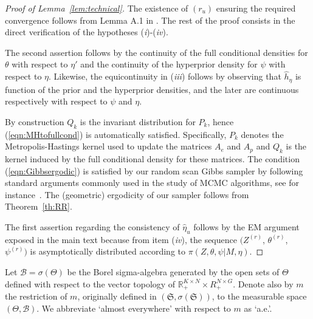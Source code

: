 \documentclass[11pt]{amsart}
\theoremstyle{definition}
\begin{document}
\begin{proof}[Proof of Lemma~\ref{lem:technical}] The existence of
$(r_u)$ ensuring the required convergence follows from Lemma A.1 in
\cite{C01}. The rest of the proof consists in the direct verification
of the hypotheses (\emph{i})-(\emph{iv}).

The second assertion follows by the continuity of the full conditional
densities for $\theta$ with respect to $\eta'$ and the continuity of
the hyperprior density for $\psi$ with respect to $\eta$. Likewise,
the equicontinuity in (\emph{iii}) follows by observing that $\widehat
h_\eta$ is function of the prior and the hyperprior densities, and the
later are continuous respectively with respect to $\psi$ and $\eta$.

By construction $Q_k$ is the invariant distribution for $P_k$, hence
(\ref{eqn:MHtofullcond}) is automatically satisfied. Specifically,
$P_k$ denotes the Metropolis-Hastings kernel used to update the
matrices $A_e$ and $A_p$ and $Q_k$ is the kernel induced by the full
conditional density for these matrices. The condition
(\ref{eqn:Gibbsergodic}) is satisfied by our random scan Gibbs sampler
by following standard arguments commonly used in the study of MCMC
algorithms, see for instance~\cite{RC}. The (geometric) ergodicity of
our sampler follows from Theorem~\ref{th:RR}.

The first assertion regarding the consistency of $\hat\eta_u$ follows
by the EM argument exposed in the main text because from item
(\emph{iv}), the sequence $(Z^{(r)}$, $\theta^{(r)}$, $\psi^{(r)})$ is
asymptotically distributed according to $\pi(Z, \theta, \psi|M,
\eta)$.
\end{proof}

Let $\mathcal B = \sigma(\Theta)$ be the Borel sigma-algebra generated
by the open sets of $\Theta$ defined with respect to the vector
topology of $\mathbb R_+^{K\times N} \times R_+^{N\times G}$. Denote
also by $m$ the restriction of $m$, originally defined in
$(\mathfrak S, \sigma(\mathfrak S))$, to the measurable space
$(\Theta, \mathcal B)$. We abbreviate `almost everywhere' with respect
to  $m$ as `a.e.'.
\end{document}

